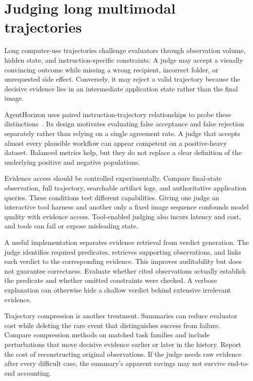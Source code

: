 \section{Judging long multimodal trajectories}\label{sec:C25:judges}
Long computer-use trajectories challenge evaluators through observation volume, hidden state, and instruction-specific constraints. A judge may accept a visually convincing outcome while missing a wrong recipient, incorrect folder, or unrequested side effect. Conversely, it may reject a valid trajectory because the decisive evidence lies in an intermediate application state rather than the final image.

AgentHorizon uses paired instruction-trajectory relationships to probe these distinctions~\cite{corpus261011050}. Its design motivates evaluating false acceptance and false rejection separately rather than relying on a single agreement rate. A judge that accepts almost every plausible workflow can appear competent on a positive-heavy dataset. Balanced metrics help, but they do not replace a clear definition of the underlying positive and negative populations.

Evidence access should be controlled experimentally. Compare final-state observation, full trajectory, searchable artifact logs, and authoritative application queries. These conditions test different capabilities. Giving one judge an interactive tool harness and another only a fixed image sequence confounds model quality with evidence access. Tool-enabled judging also incurs latency and cost, and tools can fail or expose misleading state.

A useful implementation separates evidence retrieval from verdict generation. The judge identifies required predicates, retrieves supporting observations, and links each verdict to the corresponding evidence. This improves auditability but does not guarantee correctness. Evaluate whether cited observations actually establish the predicate and whether omitted constraints were checked. A verbose explanation can otherwise hide a shallow verdict behind extensive irrelevant evidence.

Trajectory compression is another treatment. Summaries can reduce evaluator cost while deleting the rare event that distinguishes success from failure. Compare compression methods on matched task families and include perturbations that move decisive evidence earlier or later in the history. Report the cost of reconstructing original observations. If the judge needs raw evidence after every difficult case, the summary's apparent savings may not survive end-to-end accounting.

